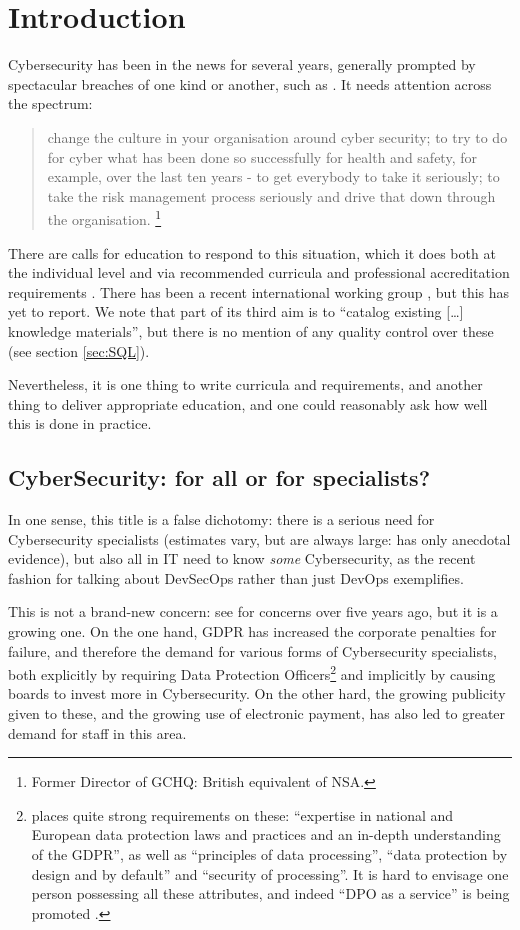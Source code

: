\documentclass[sigconf,anonymous]{acmart}
\begin{document}
\section{Introduction}

Cybersecurity has been in the news for several years, generally prompted by spectacular breaches of one kind or another, such as \cite{BritishAirways2018a}.
It needs attention across the spectrum:
\begin{quote}
change the culture in your organisation around cyber security; to try to do for cyber what has been done so successfully for health and safety, for example, over the last ten years - to get everybody to take it seriously; to take the risk management process seriously and drive that down through the organisation. \cite{Hannigan2019a}\footnote{Former Director of GCHQ: British equivalent of NSA.}
\end{quote}

There are calls for education to respond to this situation, which it does both at the individual level and via recommended curricula \cite{ACM2013a} and professional accreditation requirements \cite{BCS2018a}. There has been a recent international working group \cite{Parrishetal2018a}, but this has yet to report.  We note that part of its third aim is to ``catalog existing [\dots] knowledge materials'', but there is no mention of any quality control over these (see section \ref{sec:SQL}).

Nevertheless, it is one thing to write curricula and requirements, and
another thing to deliver appropriate education, and one could
reasonably ask how well this is done in practice.
\subsection{CyberSecurity: for all or for specialists?}
In one sense, this title is a false dichotomy: there is a serious need for Cybersecurity specialists (estimates vary, but are always large: \cite{JCNSS2018a} has only anecdotal evidence), but also all in IT need to know \emph{some} Cybersecurity, as the recent fashion for talking about DevSecOps rather than just DevOps exemplifies.

This is not a brand-new concern: see \cite{Parr2014a} for concerns over five years ago, but it is a growing one. On the one hand, GDPR has increased the corporate penalties for failure, and therefore the demand for various forms of Cybersecurity specialists, both explicitly by requiring Data Protection Officers\footnote{\cite{EU292016a} places quite strong requirements on these: ``expertise in national and European data protection laws and practices and an in-depth understanding of the GDPR'', as well as ``principles of data processing'', ``data protection by design and by default'' and ``security of processing''. It is hard to envisage one person possessing all these attributes, and indeed ``DPO as a service'' is being promoted \cite{McCreanor2018d}.} and implicitly by causing boards to invest more in Cybersecurity. On the other hard, the growing publicity given to these, and the growing use of electronic payment, has also led to greater demand for staff in this area.
\end{document}
